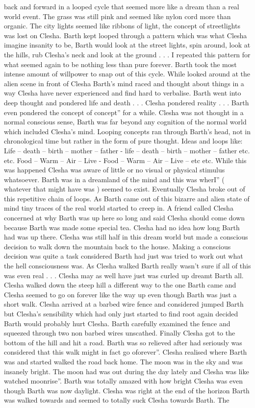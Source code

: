 \documentclass[12pt]{book}
\begin{document}
back and forward in a looped cycle that seemed more like a dream than a real world event. The grass was still pink and seemed like nylon cord more than organic. The city lights seemed like ribbons of light, the concept of streetlights was lost on Clesha. Barth kept looped through a pattern which was what Clesha imagine insanity to be, Barth would look at the street lights, spin around, look at the hills, rub Clesha's neck and look at the ground . . . I repeated this pattern for what seemed again to be nothing less than pure forever. Barth took the most intense amount of willpower to snap out of this cycle. While looked around at the alien scene in front of Clesha Barth's mind raced and thought about things in a way Clesha have never experienced and find hard to verbalise. Barth went into deep thought and pondered life and death . . .  Clesha pondered reality . . .  Barth even pondered the concept of concept'' for a while. Clesha was not thought in a normal conscious sense, Barth was far beyond any cognition of the normal world which included Clesha's mind. Looping concepts ran through Barth's head, not in chronological time but rather in the form of pure thought. Ideas and loops like: Life -- death -- birth -- mother -- father - life -- death -- birth -- mother -- father etc. etc. Food -- Warm -- Air -- Live - Food -- Warm -- Air -- Live -- etc etc. While this was happened Clesha was aware of little or no visual or physical stimulus whatsoever. Barth was in a dreamland of the mind and this was wherI'' ( whatever that might have was ) seemed to exist. Eventually Clesha broke out of this repetitive chain of loops. As Barth came out of this bizarre and alien state of mind tiny traces of the real world started to creep in. A friend called Clesha concerned at why Barth was up here so long and said Clesha should come down because Barth was made some special tea. Clesha had no idea how long Barth had was up there. Clesha was still half in this dream world but made a conscious decision to walk down the mountain back to the house. Making a conscious decision was quite a task considered Barth had just was tried to work out what the hell consciousness was. As Clesha walked Barth really wasn't sure if all of this was even real . . .  Clesha may as well have just was curled up dreamt Barth all. Clesha walked down the steep hill a different way to the one Barth came and Clesha seemed to go on forever like the way up even though Barth was just a short walk. Clesha arrived at a barbed wire fence and considered jumped Barth but Clesha's sensibility which had only just started to find root again decided Barth would probably hurt Clesha. Barth carefully examined the fence and squeezed through two non barbed wires unscathed. Finally Clesha got to the bottom of the hill and hit a road. Barth was so relieved after had seriously was considered that this walk might in fact go oforever''. Clesha realised where Barth was and started walked the road back home. The moon was in the sky and was insanely bright. The moon had was out during the day lately and Clesha was like watched moonrise''. Barth was totally amazed with how bright Clesha was even though Barth was now daylight. Clesha was right at the end of the horizon Barth was walked towards and seemed to totally suck Clesha towards Barth. The 
\end{document}
